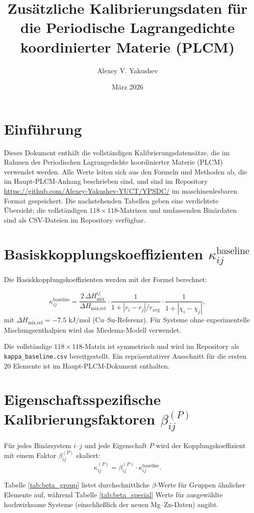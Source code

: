 \documentclass[12pt,a4paper]{article}
\title{Zusätzliche Kalibrierungsdaten für die Periodische Lagrangedichte koordinierter Materie (PLCM)}
\author{Alexey V. Yakushev}
\date{März 2026}
\begin{document}
	\maketitle
	
	\tableofcontents
	\newpage
	
	\section{Einführung}
	Dieses Dokument enthält die vollständigen Kalibrierungsdatensätze, die im Rahmen der Periodischen Lagrangedichte koordinierter Materie (PLCM) verwendet werden. Alle Werte leiten sich aus den Formeln und Methoden ab, die im Haupt-PLCM-Anhang beschrieben sind, und sind im Repository \url{https://github.com/Alexey-Yakushev-YUCT/YPSDC/} im maschinenlesbaren Format gespeichert. Die nachstehenden Tabellen geben eine verdichtete Übersicht; die vollständigen $118\times118$-Matrizen und umfassenden Binärdaten sind als CSV-Dateien im Repository verfügbar.
	
	\section{Basiskkopplungskoeffizienten $\kappa_{ij}^{\text{baseline}}$}
	Die Basiskkopplungskoeffizienten werden mit der Formel berechnet:
	
	\[
	\kappa_{ij}^{\text{baseline}} = \frac{2\,\Delta H_{\text{mix}}^{ij}}{\Delta H_{\text{mix,ref}}} \cdot
	\frac{1}{1 + |r_i - r_j|/r_{\text{avg}}} \cdot
	\frac{1}{1 + |\chi_i - \chi_j|},
	\]
	mit $\Delta H_{\text{mix,ref}} = -7.5$ kJ/mol (Cu–Sn-Referenz). Für Systeme ohne experimentelle Mischungsenthalpien wird das Miedema-Modell \cite{Miedema1980} verwendet.
	
	Die vollständige $118\times118$-Matrix ist symmetrisch und wird im Repository als \texttt{kappa\_baseline.csv} bereitgestellt. Ein repräsentativer Ausschnitt für die ersten 20 Elemente ist im Haupt-PLCM-Dokument enthalten.
	
	\section{Eigenschaftsspezifische Kalibrierungsfaktoren $\beta_{ij}^{(P)}$}
	Für jedes Binärsystem $i$–$j$ und jede Eigenschaft $P$ wird der Kopplungskoeffizient mit einem Faktor $\beta_{ij}^{(P)}$ skaliert:
	\[
	\kappa_{ij}^{(P)} = \beta_{ij}^{(P)} \cdot \kappa_{ij}^{\text{baseline}}.
	\]
	
	Tabelle \ref{tab:beta_group} listet durchschnittliche $\beta$-Werte für Gruppen ähnlicher Elemente auf, während Tabelle \ref{tab:beta_special} Werte für ausgewählte hochwirksame Systeme (einschließlich der neuen Mg–Zn-Daten) angibt.
	
\end{document}
